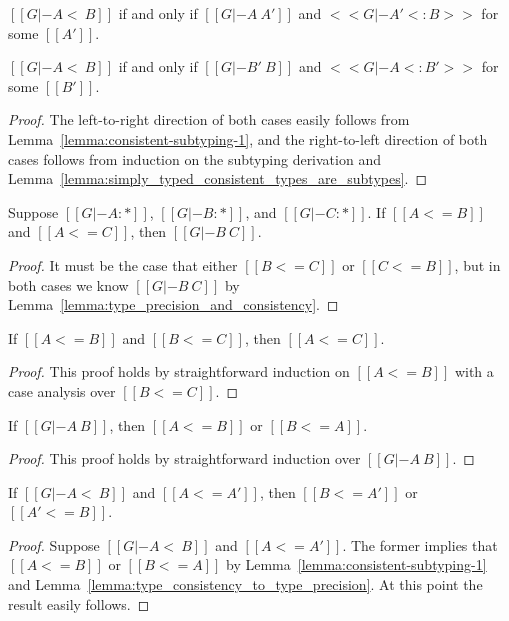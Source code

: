 \begin{corollary}
  \label{corollary:consistent_subtyping}
  \begin{enumR}
  \item[]
  \item $[[G |- A <~ B]]$ if and only if $[[G |- A ~ A']]$ and $<<G |- A' <: B>>$ for some $[[A']]$.
  \item $[[G |- A <~ B]]$ if and only if $[[G |- B' ~ B]]$ and $<<G |- A <: B'>>$ for some $[[B']]$.
  \end{enumR}
\end{corollary}
\begin{proof}
  The left-to-right direction of both cases easily follows from
  Lemma~\ref{lemma:consistent-subtyping-1}, and the right-to-left
  direction of both cases follows from induction on the subtyping
  derivation and Lemma~\ref{lemma:simply_typed_consistent_types_are_subtypes}.
\end{proof}

\begin{lemma}
  \label{lemma:type_precision_triangle_consistenty}
  Suppose $[[G |- A : *]]$, $[[G |- B : *]]$, and $[[G |- C : *]]$.
  If $[[A <= B]]$ and $[[A <= C]]$, then $[[G |- B ~ C]]$.
\end{lemma}
\begin{proof}
  It must be the case that either $[[B <= C]]$ or $[[C <= B]]$, but in both cases
  we know $[[G |- B ~ C]]$ by Lemma~\ref{lemma:type_precision_and_consistency}.
\end{proof}

\begin{lemma}
  \label{lemma:transitivity_for_type_precision}
  If $[[A <= B]]$ and $[[B <= C]]$, then $[[A <= C]]$.
\end{lemma}
\begin{proof}
  This proof holds by straightforward induction on $[[A <= B]]$ with
  a case analysis over $[[B <= C]]$.
\end{proof}

\begin{lemma}
  \label{lemma:type_consistency_to_type_precision}
  If $[[G |- A ~ B]]$, then $[[A <= B]]$ or $[[B <= A]]$.
\end{lemma}
\begin{proof}
  This proof holds by straightforward induction over $[[G |- A ~ B]]$.
\end{proof}

\begin{lemma}
  \label{lemma:cons_subtype_to_type_pre}
  If $[[G |- A <~ B]]$ and $[[A <= A']]$, then $[[B <= A']]$ or $[[A' <= B]]$.
\end{lemma}
\begin{proof}
  Suppose $[[G |- A <~ B]]$ and $[[A <= A']]$.  The former implies
  that $[[A <= B]]$ or $[[B <= A]]$ by
  Lemma~\ref{lemma:consistent-subtyping-1} and
  Lemma~\ref{lemma:type_consistency_to_type_precision}.  At this
  point the result easily follows.
\end{proof}

